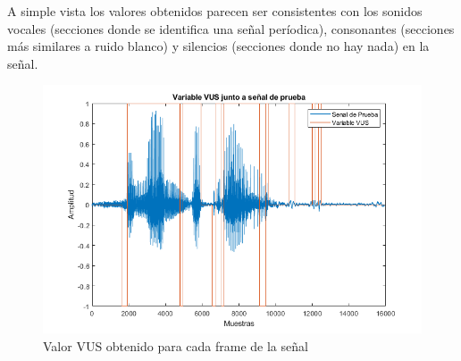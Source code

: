 \documentclass[letterpaper,onecolumn,10pt,journal,final]{IEEEtran}
\begin{document}
\begin{enumerate}[1)]
    A simple vista los valores obtenidos parecen ser consistentes con los sonidos vocales (secciones donde se identifica una señal períodica), consonantes (secciones más similares a ruido blanco) y silencios (secciones donde no hay nada) en la señal.
    \begin{figure}[H]
        \centering
        \includegraphics[width=0.9 \linewidth]{Figuras/P2_2.png}
        \caption{Valor VUS obtenido para cada frame de la señal}
        \label{P2_2}
    \end{figure}
\end{enumerate}
%
%
\end{document}
